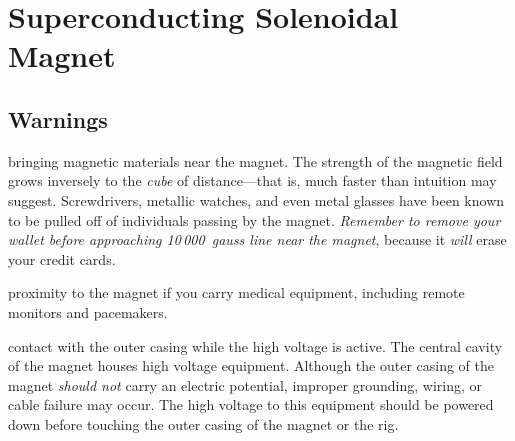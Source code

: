 
\chapter{Superconducting Solenoidal Magnet}
\label{chap:eq_magnet}

\section{Warnings}
\label{sec:eq_magnet}

\begin{avoid} bringing magnetic materials near the magnet.  The strength of the magnetic field grows inversely to the \textit{cube} of distance---that is, much faster than intuition may suggest.  Screwdrivers, metallic watches, and even metal glasses have been known to be pulled off of individuals passing by the magnet.  \textit{Remember to remove your wallet before approaching 10\,000~gauss line near the magnet}, because it \textit{will} erase your credit cards.\end{avoid}

\begin{avoid} proximity to the magnet if you carry medical equipment, including remote monitors and pacemakers.\end{avoid}

\begin{avoid} contact with the outer casing while the high voltage is active.  The central cavity of the magnet houses high voltage equipment.  Although the outer casing of the magnet \textit{should not} carry an electric potential, improper grounding, wiring, or cable failure may occur.  The high voltage to this equipment should be powered down before touching the outer casing of the magnet or the rig.\end{avoid}

